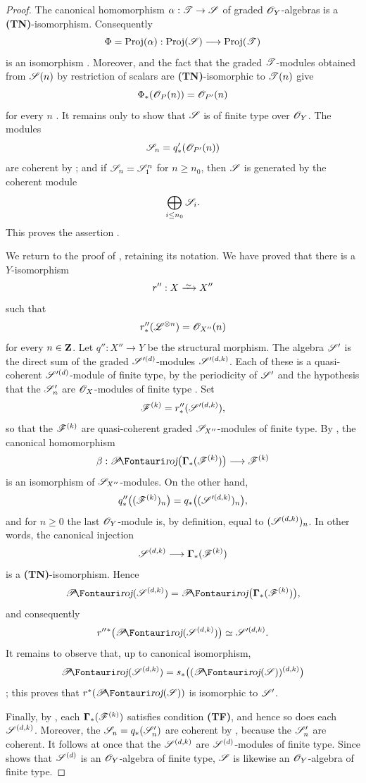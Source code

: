 \begin{proof}
The canonical homomorphism $\alpha:\mathscr{T}\to\mathscr{S}$ of graded $\mathscr{O}_Y$-algebras is a \textbf{(TN)}-isomorphism.
Consequently
\[
  \Phi=\operatorname{Proj}(\alpha):\operatorname{Proj}(\mathscr{S})\longrightarrow\operatorname{Proj}(\mathscr{T})
\]
is an isomorphism .
Moreover,  and the fact that the graded $\mathscr{T}$-modules obtained from $\mathscr{S}(n)$ by restriction of scalars are \textbf{(TN)}-isomorphic to $\mathscr{T}(n)$ give
\[
  \Phi_*(\mathscr{O}_P(n))=\mathscr{O}_{P'}(n)
\]
for every $n$ .
It remains only to show that $\mathscr{S}$ is of finite type over $\mathscr{O}_Y$.
The modules
\[
  \mathscr{S}_n=q'_*(\mathscr{O}_{P'}(n))
\]
are coherent by ; and if $\mathscr{S}_n=\mathscr{S}_1^n$ for $n\geq n_0$, then $\mathscr{S}$ is generated by the coherent module
\[
  \bigoplus_{i\leq n_0}\mathscr{S}_i.
\]
This proves the assertion .

We return to the proof of , retaining its notation.
We have proved that there is a $Y$-isomorphism
\[
  r'':X\simto X''
\]
such that
\[
  r''_*(\mathscr{L}^{\otimes n})=\mathscr{O}_{X''}(n)
\]
for every $n\in\mathbf{Z}$.
Let $q'':X''\to Y$ be the structural morphism.
The algebra $\mathscr{S}'$ is the direct sum of the graded $\mathscr{S}'^{(d)}$-modules $\mathscr{S}'^{(d,k)}$.
Each of these is a quasi-coherent $\mathscr{S}'^{(d)}$-module of finite type, by the periodicity of $\mathscr{S}'$ and the hypothesis that the $\mathscr{S}'_n$ are $\mathscr{O}_X$-modules of finite type .
Set
\[
  \mathscr{F}^{(k)}=r''_*(\mathscr{S}'^{(d,k)}),
\]
so that the $\mathscr{F}^{(k)}$ are quasi-coherent graded $\mathscr{S}_{X''}$-modules of finite type.
By , the canonical homomorphism
\[
  \beta:\shProj\bigl(\bbGamma_*(\sh{F}^{(k)})\bigr)
  \longrightarrow\sh{F}^{(k)}
\]
is an isomorphism of $\mathscr{S}_{X''}$-modules.
On the other hand,
\[
  q''_*\bigl((\mathscr{F}^{(k)})_n\bigr)
  =q_*\bigl((\mathscr{S}'^{(d,k)})_n\bigr),
\]
and for $n\geq0$ the last $\mathscr{O}_Y$-module is, by definition, equal to $(\mathscr{S}^{(d,k)})_n$.
In other words, the canonical injection
\[
  \mathscr{S}^{(d,k)}
  \longrightarrow\boldsymbol{\Gamma}_*(\mathscr{F}^{(k)})
\]
is a \textbf{(TN)}-isomorphism.
Hence
\[
  \shProj(\sh{S}^{(d,k)})
  =\shProj\bigl(\bbGamma_*(\sh{F}^{(k)})\bigr),
\]
and consequently
\[
  r''{}^*\bigl(\shProj(\sh{S}^{(d,k)})\bigr)
  \simeq\sh{S}'^{(d,k)}.
\]
It remains to observe that, up to canonical isomorphism,
\[
  \shProj(\sh{S}^{(d,k)})
  =s_*\bigl((\shProj(\sh{S}))^{(d,k)}\bigr)
\]
; this proves that $r^*(\shProj(\sh{S}))$ is isomorphic to $\mathscr{S}'$.

Finally, by , each $\boldsymbol{\Gamma}_*(\mathscr{F}^{(k)})$ satisfies condition \textbf{(TF)}, and hence so does each $\mathscr{S}^{(d,k)}$.
Moreover, the $\mathscr{S}_n=q_*(\mathscr{S}'_n)$ are coherent by , because the $\mathscr{S}'_n$ are coherent.
It follows at once that the $\mathscr{S}^{(d,k)}$ are $\mathscr{S}^{(d)}$-modules of finite type.
Since  shows that $\mathscr{S}^{(d)}$ is an $\mathscr{O}_Y$-algebra of finite type, $\mathscr{S}$ is likewise an $\mathscr{O}_Y$-algebra of finite type.
\end{proof}

